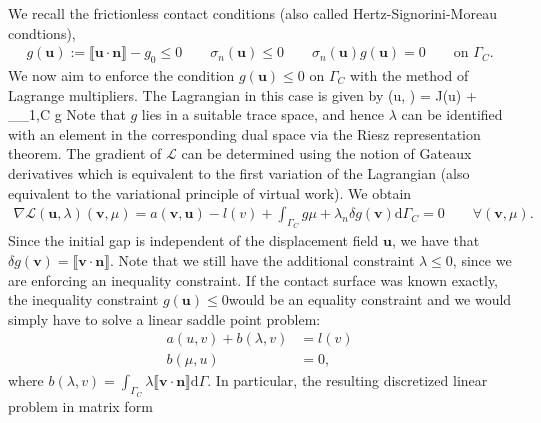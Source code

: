 \documentclass[12pt]{article}
\newenvironment{alignno}{\linenomath\align}{\endalign\linenomath}
\newcommand{\mbf}[1]{\mathbf{#1}}
\newcommand{\mrm}[1]{\mathrm{#1}}
\newcommand{\mcl}[1]{\mathcal{#1}}
\newcommand{\mbn}{\mbf{n}}
\newcommand{\mbu}{\mbf{u}}
\newcommand{\mbv}{\mbf{v}}
\newcommand{\md}{\mrm{d}}
\newcommand{\jump}[1]{\llbracket #1 \rrbracket}
\begin{document}
We recall the frictionless contact conditions (also called Hertz-Signorini-Moreau condtions),
\begin{align*}
    g(\bm u):=  \jump{\bm u \cdot \bm n} -g_0\leq 0 \qquad \sigma_n(\mbu)\leq 0 \qquad \sigma_n(\mbu)g(\mbu) = 0 \qquad \text{on } \Gamma_C.
\end{align*}
We now aim to enforce the condition $g(\bm u) \leq 0$ on $\Gamma_C$ with the method of Lagrange multipliers. The Lagrangian in this case is given by
\begin{alignno}
  \mcl{L}(\bm u, \lambda ) = J(\bm u) + \int_{\Gamma_{1,C}} \lambda g\md \Gamma
\end{alignno}
Note that $g$ lies in a suitable trace space, and hence $\lambda$ can be identified with an element in the corresponding dual space via the Riesz representation theorem.
The gradient of $\mcl{L}$ can be determined using the notion of Gateaux derivatives which is equivalent to the first variation of the Lagrangian (also equivalent to the variational principle of virtual work). We obtain
\begin{align*}
  \nabla \mcl{L}(\bm u, \lambda)(\bm v, \mu) = a(\bm v, \bm u)-l(v)+ \int_{\Gamma_C}g \mu + \lambda_n \delta g(\bm v) \md \Gamma_C = 0 \qquad \forall (\bm v, \mu).
\end{align*}
Since the initial gap is independent of the displacement field $\mbu$, we have that $\delta g(\mbv) =  \jump{\mbv \cdot \mbn}$.
Note that we still have the additional constraint $\lambda \leq 0$, since we are enforcing an inequality constraint. If the contact surface was known exactly, the inequality constraint $g(\bm u ) \leq 0 $would be an equality constraint and we would simply have to solve a linear saddle point problem:
\begin{align*}
  a(u,v) + b(\lambda, v) &= l(v)\\
  b(\mu, u)&=0,
\end{align*}
where $b(\lambda, v)  =  \int_{\Gamma_C}\lambda \jump{\mbv \cdot \mbn} \md \Gamma$.
In particular, the resulting discretized linear problem in matrix form
\end{document}
